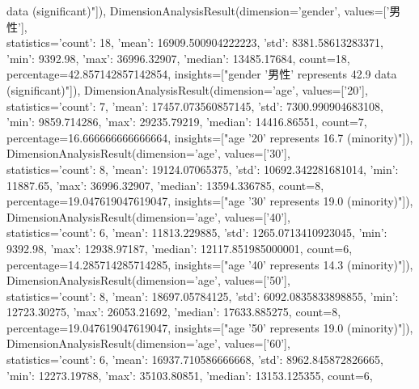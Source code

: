 \documentclass[11pt,a4paper]{article}
\begin{document}
\begin{itemize}
data (significant)"]), DimensionAnalysisResult(dimension='gender', values=['男性'],\\
statistics={'count': 18, 'mean': 16909.500904222223, 'std': 8381.58613283371,\\
'min': 9392.98, 'max': 36996.32907, 'median': 13485.17684}, count=18,\\
percentage=42.857142857142854, insights=["gender '男性' represents 42.9%
data (significant)"]), DimensionAnalysisResult(dimension='age', values=['20'],\\
statistics={'count': 7, 'mean': 17457.073560857145, 'std': 7300.990904683108,\\
'min': 9859.714286, 'max': 29235.79219, 'median': 14416.86551}, count=7,\\
percentage=16.666666666666664, insights=["age '20' represents 16.7%
(minority)"]), DimensionAnalysisResult(dimension='age', values=['30'],\\
statistics={'count': 8, 'mean': 19124.07065375, 'std': 10692.342281681014, 'min':\\
11887.65, 'max': 36996.32907, 'median': 13594.336785}, count=8,\\
percentage=19.047619047619047, insights=["age '30' represents 19.0%
(minority)"]), DimensionAnalysisResult(dimension='age', values=['40'],\\
statistics={'count': 6, 'mean': 11813.229885, 'std': 1265.0713410923045, 'min':\\
9392.98, 'max': 12938.97187, 'median': 12117.851985000001}, count=6,\\
percentage=14.285714285714285, insights=["age '40' represents 14.3%
(minority)"]), DimensionAnalysisResult(dimension='age', values=['50'],\\
statistics={'count': 8, 'mean': 18697.05784125, 'std': 6092.0835833898855, 'min':\\
12723.30275, 'max': 26053.21692, 'median': 17633.885275}, count=8,\\
percentage=19.047619047619047, insights=["age '50' represents 19.0%
(minority)"]), DimensionAnalysisResult(dimension='age', values=['60'],\\
statistics={'count': 6, 'mean': 16937.710586666668, 'std': 8962.845872826665,\\
'min': 12273.19788, 'max': 35103.80851, 'median': 13153.125355}, count=6,\\

\end{itemize}
\end{document}

